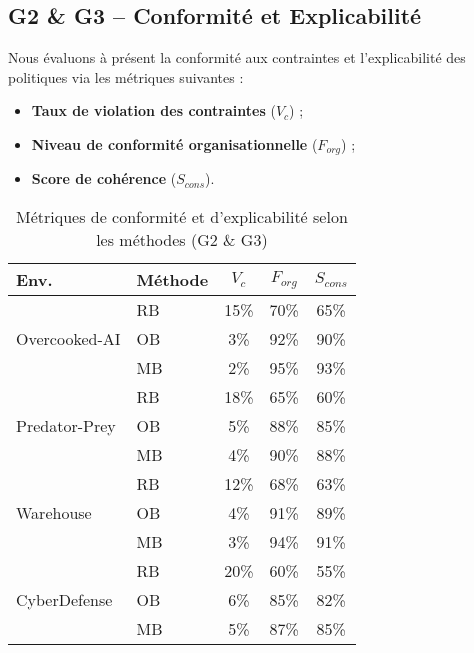 \subsection{G2 \& G3 – Conformité et Explicabilité}

Nous évaluons à présent la conformité aux contraintes et l'explicabilité des politiques via les métriques suivantes :

\begin{itemize}
    \item \textbf{Taux de violation des contraintes} ($V_c$) ;
    \item \textbf{Niveau de conformité organisationnelle} ($F_{org}$) ;
    \item \textbf{Score de cohérence} ($S_{cons}$).
\end{itemize}

\begin{table}[h!]
    \centering
    \caption{Métriques de conformité et d'explicabilité selon les méthodes (G2 \& G3)}
    \begin{tabular}{l|l|ccc}
        \hline
        \textbf{Env.} & \textbf{Méthode} & $V_c$ & $F_{org}$ & $S_{cons}$ \\
        \hline
        \multirow{3}{*}{Overcooked-AI}
                      & RB              & 15\%  & 70\%      & 65\%       \\
                      & OB              & 3\%   & 92\%      & 90\%       \\
                      & MB              & 2\%   & 95\%      & 93\%       \\
        \hline
        \multirow{3}{*}{Predator-Prey}
                      & RB              & 18\%  & 65\%      & 60\%       \\
                      & OB              & 5\%   & 88\%      & 85\%       \\
                      & MB              & 4\%   & 90\%      & 88\%       \\
        \hline
        \multirow{3}{*}{Warehouse}
                      & RB              & 12\%  & 68\%      & 63\%       \\
                      & OB              & 4\%   & 91\%      & 89\%       \\
                      & MB              & 3\%   & 94\%      & 91\%       \\
        \hline
        \multirow{3}{*}{CyberDefense}
                      & RB              & 20\%  & 60\%      & 55\%       \\
                      & OB              & 6\%   & 85\%      & 82\%       \\
                      & MB              & 5\%   & 87\%      & 85\%       \\
        \hline
    \end{tabular}
    \label{tab:g2_g3_full}
\end{table}

